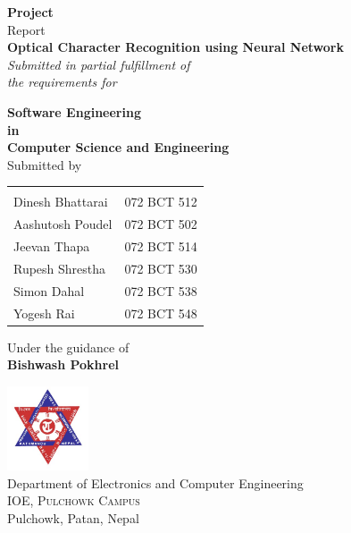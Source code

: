 \begin{titlepage}

\begin{center}

\textup{\small {\bf Project} \\ Report}\\[0.2in]

\Large \textbf {Optical Character Recognition using Neural Network}\\[0.5in]

       \small \emph{Submitted in partial fulfillment of\\
        the requirements for}
        \vspace{.2in}

       {\bf Software Engineering \\in\\ Computer Science and Engineering}\\[0.5in]

\normalsize Submitted by \\
\begin{table}[h]
\centering
\begin{tabular}{lr}\hline \\
		Dinesh Bhattarai    &   072 BCT 512\\
		Aashutosh Poudel    &   072 BCT 502\\
		Jeevan Thapa        &   072 BCT 514\\
		Rupesh Shrestha     &   072 BCT 530\\
		Simon Dahal         &   072 BCT 538\\
		Yogesh Rai          &   072 BCT 548\\ \hline
\end{tabular}
\end{table}

\vspace{.1in}
Under the guidance of\\
{\textbf{Bishwash Pokhrel}}\\[0.2in]

\vfill

\includegraphics[width=0.18\textwidth]{./tu}\\[0.1in]
\Large{Department of Electronics and Computer Engineering}\\
\normalsize
\textsc{IOE, Pulchowk Campus}\\
Pulchowk, Patan, Nepal\\
\vspace{0.2cm}

\end{center}
\end{titlepage}
